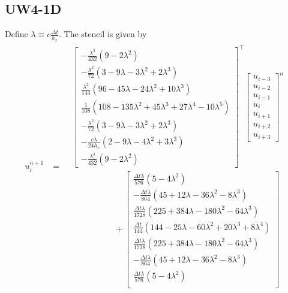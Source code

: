 \documentclass[12pt]{article}
\begin{document}
\subsection{UW4-1D}
Define $\lambda \equiv c \tfrac{\Delta t}{h_x}$.
The stencil \cite[eqn. (74), (73), \& app. A.1]{Banks2012} is given by
\begin{align}
u_{i}^{n+1} &= 
\begin{aligned}
&
\begin{bmatrix}
-\tfrac{\lambda^3}{432}(9 -2 \lambda^2) \\
-\tfrac{\lambda^2}{72} (3 - 9 \lambda - 3 \lambda^2 + 2 \lambda^3) \\
\tfrac{\lambda^2}{144} (96 - 45 \lambda - 24 \lambda^2 + 10 \lambda^3) \\
\tfrac{1}{108} (108 - 135 \lambda^2 +45 \lambda^3 + 27 \lambda^4 -10 \lambda^5) \\  
-\tfrac{\lambda^2}{72} (3 - 9 \lambda - 3 \lambda^2 + 2 \lambda^3) \\
-\tfrac{c \lambda}{24 h_x} (2 - 9 \lambda - 4 \lambda^2 + 3 \lambda^3) \\
-\tfrac{\lambda^3}{432}(9 -2 \lambda^2)
\end{bmatrix}^\top
\begin{bmatrix}
u_{i-3} \\
u_{i-2} \\
u_{i-1} \\
u_i  \\
u_{i+1} \\
u_{i+2} \\
u_{i+3}
\end{bmatrix}^n 
\\
&\quad \quad \quad \quad \quad+ 
\begin{bmatrix}
\tfrac{\Delta t \lambda}{576}(5 - 4 \lambda^2) \\
-\tfrac{\Delta t \lambda}{864} (45 + 12 \lambda - 36 \lambda^2 - 8 \lambda^3) \\
\tfrac{\Delta t \lambda}{1728} (225 + 384 \lambda - 180 \lambda^2 - 64 \lambda^3) \\
\tfrac{\Delta t }{144} (144 - 25 \lambda - 60 \lambda^2 + 20 \lambda^3 + 8  \lambda^4) \\  
\tfrac{\Delta t \lambda}{1728} (225 + 384 \lambda - 180 \lambda^2 - 64 \lambda^3) \\
-\tfrac{\Delta t \lambda}{864} (45 + 12 \lambda - 36 \lambda^2 - 8 \lambda^3) \\
\tfrac{\Delta t \lambda}{576}(5 - 4 \lambda^2) \\

\end{bmatrix}
\end{aligned}
\end{align}
\end{document}

